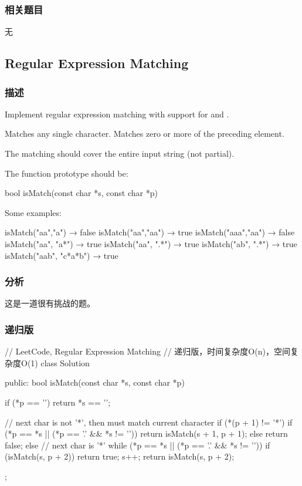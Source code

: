 \subsubsection{相关题目}
\begindot
\item 无
\myenddot


\subsection{Regular Expression Matching} %
\label{sec:regular-expression-matching}


\subsubsection{描述}
Implement regular expression matching with support for  and .

 Matches any single character.
 Matches zero or more of the preceding element.

The matching should cover the entire input string (not partial).

The function prototype should be:
\begin{Code}
	bool isMatch(const char *s, const char *p)
\end{Code}

Some examples:
\begin{Code}
	isMatch("aa","a") → false
	isMatch("aa","aa") → true
	isMatch("aaa","aa") → false
	isMatch("aa", "a*") → true
	isMatch("aa", ".*") → true
	isMatch("ab", ".*") → true
	isMatch("aab", "c*a*b") → true
\end{Code}


\subsubsection{分析}
这是一道很有挑战的题。


\subsubsection{递归版}
\begin{Code}
	// LeetCode, Regular Expression Matching
	// 递归版，时间复杂度O(n)，空间复杂度O(1)
	class Solution {
		public:
		bool isMatch(const char *s, const char *p) {
			if (*p == '\0') return *s == '\0';
			
			// next char is not '*', then must match current character
			if (*(p + 1) != '*') {
				if (*p == *s || (*p == '.' && *s != '\0'))
				return isMatch(s + 1, p + 1);
				else
				return false;
			} else { // next char is '*'
			while (*p == *s || (*p == '.' && *s != '\0')) {
				if (isMatch(s, p + 2))
				return true;
				s++;
			}
			return isMatch(s, p + 2);
		}
	}
};
\end{Code}


